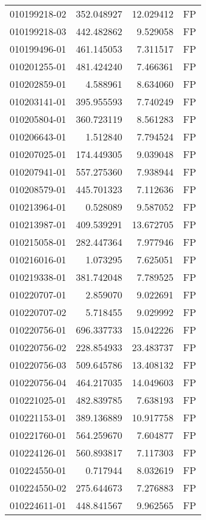 \begin{tabular}{lrrl}
010199218-02 &  352.048927 &    12.029412 &   FP \\
010199218-03 &  442.482862 &     9.529058 &   FP \\
010199496-01 &  461.145053 &     7.311517 &   FP \\
010201255-01 &  481.424240 &     7.466361 &   FP \\
010202859-01 &    4.588961 &     8.634060 &   FP \\
010203141-01 &  395.955593 &     7.740249 &   FP \\
010205804-01 &  360.723119 &     8.561283 &   FP \\
010206643-01 &    1.512840 &     7.794524 &   FP \\
010207025-01 &  174.449305 &     9.039048 &   FP \\
010207941-01 &  557.275360 &     7.938944 &   FP \\
010208579-01 &  445.701323 &     7.112636 &   FP \\
010213964-01 &    0.528089 &     9.587052 &   FP \\
010213987-01 &  409.539291 &    13.672705 &   FP \\
010215058-01 &  282.447364 &     7.977946 &   FP \\
010216016-01 &    1.073295 &     7.625051 &   FP \\
010219338-01 &  381.742048 &     7.789525 &   FP \\
010220707-01 &    2.859070 &     9.022691 &   FP \\
010220707-02 &    5.718455 &     9.029992 &   FP \\
010220756-01 &  696.337733 &    15.042226 &   FP \\
010220756-02 &  228.854933 &    23.483737 &   FP \\
010220756-03 &  509.645786 &    13.408132 &   FP \\
010220756-04 &  464.217035 &    14.049603 &   FP \\
010221025-01 &  482.839785 &     7.638193 &   FP \\
010221153-01 &  389.136889 &    10.917758 &   FP \\
010221760-01 &  564.259670 &     7.604877 &   FP \\
010224126-01 &  560.893817 &     7.117303 &   FP \\
010224550-01 &    0.717944 &     8.032619 &   FP \\
010224550-02 &  275.644673 &     7.276883 &   FP \\
010224611-01 &  448.841567 &     9.962565 &   FP \\

\end{tabular}

